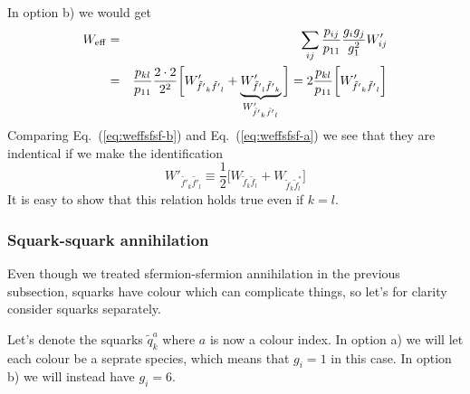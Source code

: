 \documentclass[a4paper,10pt,oneside]{book}
\begin{document}
In option b) we would get 
\begin{eqnarray}
    W_{\rm eff} & = & \sum_{ij}\frac{p_{ij}}{p_{11}} 
    \frac{g_{i}g_{j}}{g_{1}^2} W'_{ij}
    \nonumber \\
    & = & \frac{p_{kl}}{p_{11}} \frac{2 \cdot 2}{2^2}
    \bigg[ 
    W'_{\tilde{f'}_{k} \tilde{f'}_{l}} +
    \underbrace{W'_{\tilde{f'}_{l} \tilde{f'}_{k}}}_
       {W'_{\tilde{f'}_{k} \tilde{f'}_{l}}} \bigg]
    = 2 \frac{p_{kl}}{p_{11}} \bigg[
    W'_{\tilde{f'}_{k} \tilde{f'}_{l}}\bigg]
    \label{eq:weffsfsf-b}
\end{eqnarray}
Comparing Eq.~(\ref{eq:weffsfsf-b}) and Eq.~(\ref{eq:weffsfsf-a}) we 
see that they are indentical if we make the identification
\begin{equation}
    W'_{\tilde{f'}_{k} \tilde{f'}_{l}} \equiv 
    \frac{1}{2} \bigg[
    W_{\tilde{f}_{k} \tilde{f}_{l}} + 
    W_{\tilde{f}_{k} \tilde{f}_{l}^*} \bigg] 
\end{equation}
It is easy to show that this relation holds true even if $k=l$.

\subsubsection{Squark-squark annihilation}
\label{sec:sqsq}

Even though we treated sfermion-sfermion annihilation in the previous subsection, squarks have colour which can complicate things, so let's for clarity consider squarks separately.

Let's denote the squarks $\tilde{q}_k^a$ where $a$ is now a colour index. In option a) we will let each colour be a seprate species, which means that $g_i=1$ in this case. In option b) we will instead have $g_i=6$.
\end{document}
